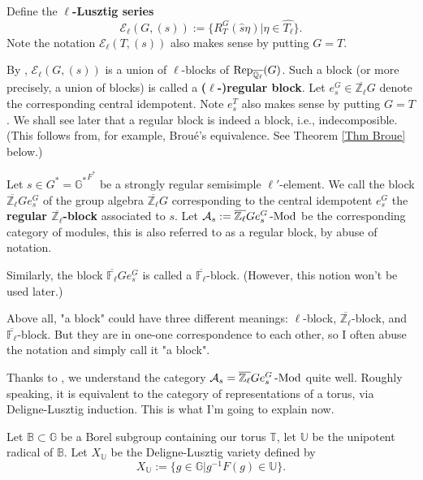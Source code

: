 	Define the \textbf{$\ell$-Lusztig series} 
	$$\mathcal{E}_\ell(G, (s)):=\{R_T^G(\hat{s}\eta)| \eta \in \widehat{T_\ell}\}.$$ Note the notation $\mathcal{E}_\ell(T, (s))$ also makes sense by putting $G=T$.
	
	By \cite{michel1989bloc}, $\mathcal{E}_\ell(G, (s))$ is a union of $\ell$-blocks of $\operatorname{\operatorname{Rep}}_{\overline{\mathbb{Q}_\ell}}(G)$. Such a block (or more precisely, a union of blocks) is called a \textbf{($\ell$-)regular block}. Let $e_s^G \in \overline{\mathbb{Z}_\ell}G$ denote the corresponding central idempotent. Note $e_s^T$ also makes sense by putting $G=T$. We shall see later that a regular block is indeed a block, i.e., indecomposible. (This follows from, for example, Broué's equivalence. See Theorem \ref{Thm Broue} below.)
	
	\begin{definition}\label{Def Regular Block}
		Let $s \in G^*={\mathbb{G}^*}^{F^*}$ be a strongly regular semisimple $\ell'$-element.
		We call the block $\overline{\mathbb{Z}_\ell}Ge_s^G$ of the group algebra $\overline{\mathbb{Z}_\ell}G$ corresponding to the central idempotent $e_s^G$ the \textbf{regular $\overline{\mathbb{Z}_\ell}$-block} associated to $s$. Let $\mathcal{A}_s:=\overline{\mathbb{Z}_\ell}Ge_s^G\operatorname{-Mod}$ be the corresponding category of modules, this is also referred to as a regular block, by abuse of notation.
		
		Similarly, the block $\overline{\mathbb{F}_\ell}Ge_s^G$ is called a $\overline{\mathbb{F}_{\ell}}$-block. (However, this notion won't be used later.)
	\end{definition}
	
	\begin{remark}
		Above all, "a block" could have three different meanings: $\ell$-block, $\overline{\mathbb{Z}_{\ell}}$-block, and $\overline{\mathbb{F}_{\ell}}$-block. But they are in one-one correspondence to each other, so I often abuse the notation and simply call it "a block".
	\end{remark}
	
	Thanks to \cite{broue1990isometries}, we understand the category $\mathcal{A}_s=\overline{\mathbb{Z}_\ell}Ge_s^G\operatorname{-Mod}$ quite well. Roughly speaking, it is equivalent to the category of representations of a torus, via Deligne-Lusztig induction. This is what I'm going to explain now.
	
	Let $\mathbb{B} \subset \mathbb{G}$ be a Borel subgroup containing our torus $\mathbb{T}$, let $\mathbb{U}$ be the unipotent radical of $\mathbb{B}$. Let $X_{\mathbb{U}}$ be the Deligne-Lusztig variety defined by
	$$X_{\mathbb{U}}:=\{g \in \mathbb{G} | g^{-1}F(g) \in \mathbb{U}\}.$$
	
